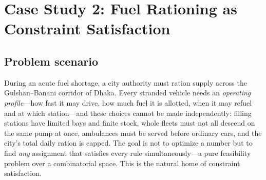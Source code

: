 \documentclass[10pt]{article}
\begin{document}
\section{Case Study 2: Fuel Rationing as Constraint Satisfaction}
\subsection{Problem scenario}
During an acute fuel shortage, a city authority must ration supply across the
Gulshan--Banani corridor of Dhaka. Every stranded vehicle needs an
\emph{operating profile}---how fast it may drive, how much fuel it is allotted,
when it may refuel and at which station---and these choices cannot be made
independently: filling stations have limited bays and finite stock, whole fleets
must not all descend on the same pump at once, ambulances must be served before
ordinary cars, and the city's total daily ration is capped. The goal is not to
optimize a number but to find \emph{any} assignment that satisfies every rule
simultaneously---a pure feasibility problem over a combinatorial space. This is
the natural home of constraint satisfaction.
\end{document}
